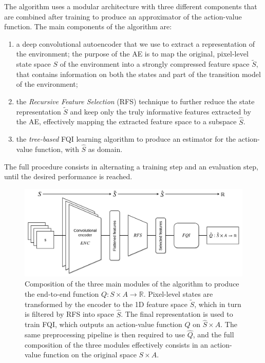 The algorithm uses a modular architecture with three different components that 
are combined after training to produce an approximator of the action-value 
function. The main components of the algorithm are:
%
\begin{enumerate}
    \item a deep convolutional autoencoder that we use to extract a 
    representation of the environment;
    the purpose of the AE is to map the original, pixel-level state space $S$ of
    the environment into a strongly compressed feature space ${\tilde{S}}$, 
    that contains information on both the states and part of the transition 
    model of the environment;
    \item the \textit{Recursive Feature Selection} (RFS) technique to further 
    reduce the state representation $\tilde{S}$ and keep only the truly 
    informative features extracted by the AE, effectively mapping the extracted 
    feature space to a subspace $\hat{S}$.
    \item the \textit{tree-based} FQI learning algorithm to produce an 
    estimator for the action-value function, with $\hat{S}$ as domain. 
\end{enumerate}
%
The full procedure consists in alternating a training step and an evaluation 
step, until the desired performance is reached.
%
\begin{figure}
    \includegraphics[width=\textwidth]{pictures/full_pipeline}
    \centering
    \caption[Schematic view of the three main modules]{Composition of the three 
	    main modules of the algorithm to produce the end-to-end function 
	    $Q: S \times A \rightarrow \mathbb{R}$. Pixel-level states are 
	    transformed by the encoder to the 1D feature space $\tilde{S}$, 
	    which in turn is filtered by RFS into space $\hat{S}$. The final 
	    representation is used to train FQI, which outputs an action-value 
	    function $\hat{Q}$ on $\hat{S} \times A$. 
	    The same preprocessing pipeline is then required to use $\hat{Q}$, 
	    and the full composition of the three modules effectively consists 
	    in an action-value function on the original space $S \times A$.}
    \label{f:full_pipeline}
\end{figure}
%

